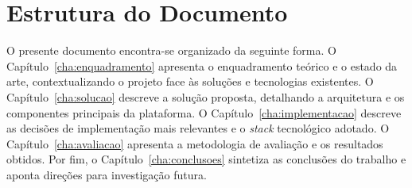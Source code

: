 \section{Estrutura do Documento}
\label{sec:estrutura}

O presente documento encontra-se organizado da seguinte forma. O Capítulo~\ref{cha:enquadramento} apresenta o enquadramento teórico e o estado da arte, contextualizando o projeto face às soluções e tecnologias existentes. O Capítulo~\ref{cha:solucao} descreve a solução proposta, detalhando a arquitetura e os componentes principais da plataforma. O Capítulo~\ref{cha:implementacao} descreve as decisões de implementação mais relevantes e o \textit{stack} tecnológico adotado. O Capítulo~\ref{cha:avaliacao} apresenta a metodologia de avaliação e os resultados obtidos. Por fim, o Capítulo~\ref{cha:conclusoes} sintetiza as conclusões do trabalho e aponta direções para investigação futura.
